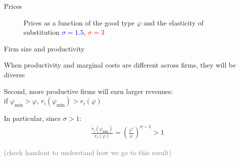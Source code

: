 \documentclass[notes,11pt, aspectratio=169, xcolor=table]{beamer}
\newenvironment{wideitemize}{\itemize\addtolength{\itemsep}{10pt}}{\enditemize}
\begin{document}
\begin{frame}{Prices}

        \begin{figure}[htp]
        \centering
            \caption{Prices as a function of the good type $\varphi$ and the elasticity of substitution \textcolor{blue}{$\sigma=1.5$}, \textcolor{red}{$\sigma=3$}}
        \label{fig: ces-markup}
    \end{figure}
    
\end{frame}

\begin{frame}{Firm size and productivity}

    \begin{wideitemize}
        \item When productivity and marginal costs are different across firms, they will be diverse

        \item Second, more productive firms will earn larger revenues: \\
        \qquad if $\varphi_{\min}>\varphi$, $r_i(\varphi_{\min})>r_i(\varphi)$

        \item In particular, since $\sigma > 1$:
            \begin{eqnarray*}
    \frac{r_i(\varphi_{\min})}{r_i(\varphi)} = \left( \frac{\varphi'}{\varphi} \right)^{\sigma-1} > 1 
\end{eqnarray*}

    \qquad \textcolor{gray}{(check handout to understand how we go to this result)}


    \end{wideitemize}
\end{frame}
\end{document}
